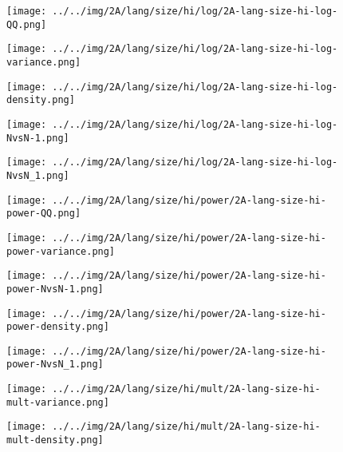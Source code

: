 \begin{figure}[H]
\centering	\texttt{[image: ../../img/2A/lang/size/hi/log/2A-lang-size-hi-log-QQ.png]}
\end{figure}
\begin{figure}[H]
\centering	\texttt{[image: ../../img/2A/lang/size/hi/log/2A-lang-size-hi-log-variance.png]}
\end{figure}
\begin{figure}[H]
\centering	\texttt{[image: ../../img/2A/lang/size/hi/log/2A-lang-size-hi-log-density.png]}
\end{figure}
\begin{figure}[H]
\centering	\texttt{[image: ../../img/2A/lang/size/hi/log/2A-lang-size-hi-log-NvsN-1.png]}
\end{figure}
\begin{figure}[H]
\centering	\texttt{[image: ../../img/2A/lang/size/hi/log/2A-lang-size-hi-log-NvsN\_1.png]}
\end{figure}
\begin{figure}[H]
\centering	\texttt{[image: ../../img/2A/lang/size/hi/power/2A-lang-size-hi-power-QQ.png]}
\end{figure}
\begin{figure}[H]
\centering	\texttt{[image: ../../img/2A/lang/size/hi/power/2A-lang-size-hi-power-variance.png]}
\end{figure}
\begin{figure}[H]
\centering	\texttt{[image: ../../img/2A/lang/size/hi/power/2A-lang-size-hi-power-NvsN-1.png]}
\end{figure}
\begin{figure}[H]
\centering	\texttt{[image: ../../img/2A/lang/size/hi/power/2A-lang-size-hi-power-density.png]}
\end{figure}
\begin{figure}[H]
\centering	\texttt{[image: ../../img/2A/lang/size/hi/power/2A-lang-size-hi-power-NvsN\_1.png]}
\end{figure}
\begin{figure}[H]
\centering	\texttt{[image: ../../img/2A/lang/size/hi/mult/2A-lang-size-hi-mult-variance.png]}
\end{figure}
\begin{figure}[H]
\centering	\texttt{[image: ../../img/2A/lang/size/hi/mult/2A-lang-size-hi-mult-density.png]}
\end{figure}
